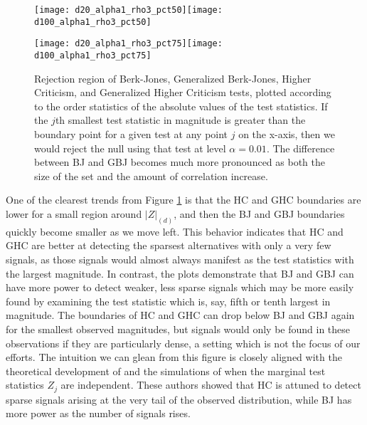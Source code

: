 \documentclass[12pt]{article}
\begin{document}
\begin{figure}[!ht]
\begin{center}
\centerline{\texttt{[image: d20\_alpha1\_rho3\_pct50]}\texttt{[image: d100\_alpha1\_rho3\_pct50]}}
\centerline{\texttt{[image: d20\_alpha1\_rho3\_pct75]}\texttt{[image: d100\_alpha1\_rho3\_pct75]}}
\end{center}
\caption{Rejection region of Berk-Jones, Generalized Berk-Jones, Higher Criticism, and Generalized Higher Criticism tests, plotted according to the order statistics of the absolute values of the test statistics.  If the $j$th smallest test statistic in magnitude is greater than the boundary point for a given test at any point $j$ on the x-axis, then we would reject the null using that test at level $\alpha=0.01$. The difference between BJ and GBJ becomes much more pronounced as both the size of the set and the amount of correlation increase.}
\label{p2_fig:rej_region_fig}
\end{figure}

One of the clearest trends from Figure \ref{p2_fig:rej_region_fig} is that the HC and GHC boundaries
are lower for a small region around $|Z|_{(d)}$, and then the BJ
and GBJ boundaries quickly become smaller as we move left. 
This behavior indicates that HC and GHC are better at detecting the sparsest
alternatives with only a very few signals, as those signals would
almost always manifest as the test statistics with the largest magnitude.
In contrast, the plots demonstrate that BJ and GBJ can have more power
to detect weaker, less sparse signals which may be more easily found
by examining the test statistic which is, say, fifth or tenth largest
in magnitude. 
The boundaries of HC and GHC can drop below BJ and GBJ again for the smallest
observed magnitudes, but signals would only be found in these observations if they 
are particularly dense, a setting which is not the focus of our efforts. 
The intuition we can glean from this figure is closely aligned with the
theoretical development of \citet{HC} and the simulations
of \citet{LiSiegmund} when the marginal test statistics $Z_j$ are independent. 
These authors showed that HC is attuned to
detect sparse signals arising at the very tail of the observed
distribution, while BJ has more power as the number of signals rises.
\end{document}
